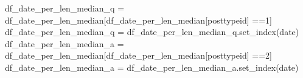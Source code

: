 \documentclass[
  letterpaper,
  DIV=11,
  numbers=noendperiod]{scrartcl}
\newenvironment{Shaded}{\begin{snugshade}}{\end{snugshade}}
\newcommand{\NormalTok}[1]{\textcolor[rgb]{0.00,0.23,0.31}{#1}}
\newcommand{\OperatorTok}[1]{\textcolor[rgb]{0.37,0.37,0.37}{#1}}
\newcommand{\StringTok}[1]{\textcolor[rgb]{0.13,0.47,0.30}{#1}}
\begin{document}
\begin{Shaded}
\begin{Highlighting}[]
\NormalTok{df\_date\_per\_len\_median\_q }\OperatorTok{=}\NormalTok{ df\_date\_per\_len\_median[df\_date\_per\_len\_median[}\StringTok{\textquotesingle{}posttypeid\textquotesingle{}}\NormalTok{] }\OperatorTok{==}\StringTok{\textquotesingle{}1\textquotesingle{}}\NormalTok{]}
\NormalTok{df\_date\_per\_len\_median\_q }\OperatorTok{=}\NormalTok{ df\_date\_per\_len\_median\_q.set\_index(}\StringTok{\textquotesingle{}date\textquotesingle{}}\NormalTok{)}
\NormalTok{df\_date\_per\_len\_median\_a }\OperatorTok{=}\NormalTok{ df\_date\_per\_len\_median[df\_date\_per\_len\_median[}\StringTok{\textquotesingle{}posttypeid\textquotesingle{}}\NormalTok{] }\OperatorTok{==}\StringTok{\textquotesingle{}2\textquotesingle{}}\NormalTok{]}
\NormalTok{df\_date\_per\_len\_median\_a }\OperatorTok{=}\NormalTok{ df\_date\_per\_len\_median\_a.set\_index(}\StringTok{\textquotesingle{}date\textquotesingle{}}\NormalTok{)}
\end{Highlighting}
\end{Shaded}
\end{document}
